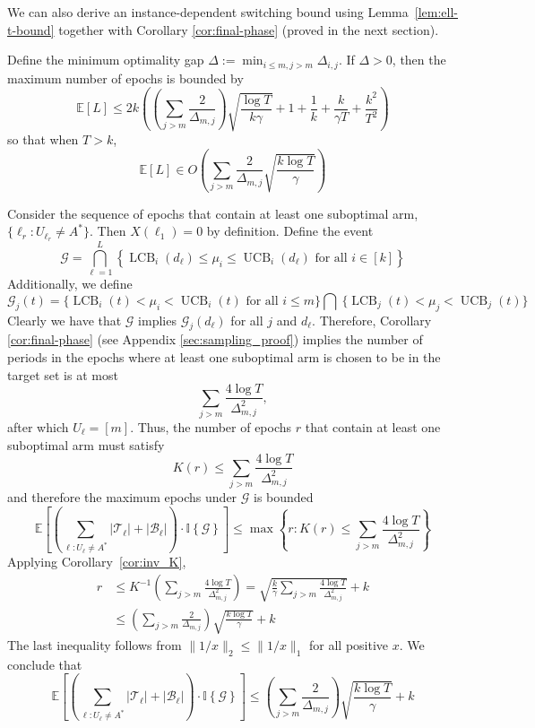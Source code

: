 \documentclass[opre,blindrev]{informs3}
\newcommand{\UCB}{\operatorname{UCB}}
\newcommand{\LCB}{\operatorname{LCB}}
\newcommand{\ind}[1]{\mathbb{I}\left\{#1\right\}}
\newcommand{\bE}[1]{{\mathbb{E}\left[#1\right]}}
\begin{document}
\begin{APPENDICES}
We can also derive an instance-dependent switching bound using Lemma~\ref{lem:ell-t-bound} together with Corollary \ref{cor:final-phase} (proved in the next section).
\begin{lemma}\label{lem:delta-max-epoch}
    Define the minimum optimality gap \(\Delta:=\min_{i\leq m, j>m}\Delta_{i,j}\). If \(\Delta>0\), then the maximum number of epochs is bounded by
    \[\bE{L}\leq 2k\left(\left(\sum_{j>m}\frac{2}{\Delta_{m,j}}\right)\sqrt{\frac{\log T}{k\gamma}}+1+\frac{1}{k}+\frac{k}{\gamma T}+\frac{k^2}{T^2}\right)\]
    so that when \(T> k\),
    \[\bE{L}\in O\left(\sum_{j>m}\frac{2}{\Delta_{m,j}}\sqrt{\frac{k\log T}{\gamma}}\right)\]
\end{lemma}
    Consider the sequence of epochs that contain at least one suboptimal arm, \(\{\ell_r: U_{\ell_r}\neq A^*\}\). Then \(X(\ell_1)=0\) by definition. Define the event 
    \[\mathcal{G}=\bigcap_{\ell=1}^L\left\{\LCB_i(d_{\ell})\leq \mu_i\leq\UCB_i(d_{\ell}) \text{ for all } i\in[k]\right\}\]
    Additionally, we define 
    \[
    \mathcal{G}_j(t)=\bigg\{\LCB_i(t)<\mu_i<\UCB_i(t) \text{ for all } i\leq m\bigg\} \bigcap ~\bigg\{\LCB_j(t)<\mu_j<\UCB_j(t)\bigg\}
    \]
    Clearly we have that \(\mathcal{G}\) implies \(\mathcal{G}_j(d_{\ell})\) for all \(j\) and \(d_{\ell}\). Therefore, Corollary \ref{cor:final-phase} (see Appendix \ref{sec:sampling_proof}) implies the number of periods in the epochs where at least one suboptimal arm is chosen to be in the target set is at most
    \[\sum_{j>m}\frac{4\log T}{\Delta_{m,j}^2},\]
    after which \(U_{\ell}=[m]\). Thus, the number of epochs \(r\) that contain at least one suboptimal arm must satisfy 
    \[K(r)\leq \sum_{j>m}\frac{4\log T}{\Delta_{m,j}^2}\]
    and therefore the maximum epochs under \(\mathcal{G}\) is bounded
    \[\bE{\left(\sum_{\ell:U_{\ell}\neq A^*}|\mathcal{T}_{\ell}|+|\mathcal{B}_{\ell}|\right)\cdot \ind{\mathcal{G}}}\leq \max\left\{r: K(r)\leq \sum_{j>m}\frac{4\log T}{\Delta_{m,j}^2}\right\}\]
    Applying Corollary~\ref{cor:inv_K},
    \begin{align*}
        r&\leq K^{-1}\left(\sum_{j>m}\frac{4\log T}{\Delta_{m,j}^2}\right)=\sqrt{\frac{k}{\gamma}\sum_{j>m}\frac{4\log T}{\Delta_{m,j}^2}}+k\\
        &\leq \left(\sum_{j>m}\frac{2}{\Delta_{m,j}}\right)\sqrt{\frac{k\log T}{\gamma}}+k
    \end{align*}
    The last inequality follows from \(\|1/x\|_2\leq \|1/x\|_1\) for all positive \(x\). We conclude that 
    \[\bE{\left(\sum_{\ell:U_{\ell}\neq A^*}|\mathcal{T}_{\ell}|+|\mathcal{B}_{\ell}|\right)\cdot \ind{\mathcal{G}}}\leq \left(\sum_{j>m}\frac{2}{\Delta_{m,j}}\right)\sqrt{\frac{k\log T}{\gamma}}+k\]

\end{APPENDICES}
\end{document}
